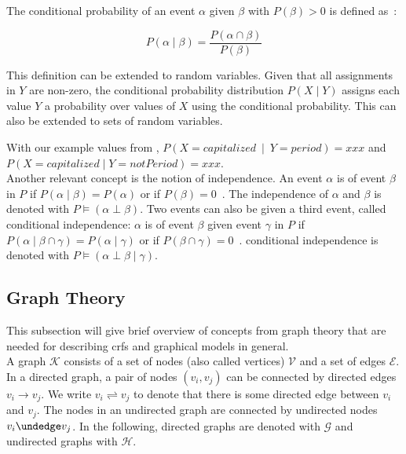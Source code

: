 The \gls{conditional probability} of an event $\alpha$ given $\beta$ with $P(\beta)>0$ is defined as~\cite{koller2009probabilistic}:

\begin{equation}
P(\alpha\mid\beta) = \frac{P(\alpha\cap\beta)}{P(\beta)}
\label{equ:conditional-probability}
\end{equation}

This definition can be extended to \glspl{random variable}.
Given that all assignments in $Y$ are non-zero, the \gls{conditional probability distribution} $P(X\mid Y)$ assigns each value $Y$ a probability over values of $X$ using the \gls{conditional probability}.
This can also be extended to sets of \glspl{random variable}.

With our example values from , $P(X=capitalized\ \mid\ Y=period)=xxx$ and $P(X=capitalized\mid Y=notPeriod)=xxx$.\\

Another relevant concept is the notion of \gls{independence}.
An \gls{event} $\alpha$ is  of \gls{event} $\beta$ in $P$ if $P(\alpha\mid\beta)=P(\alpha)$ or if $P(\beta)=0$~\cite{koller2009probabilistic}.
The \gls{independence} of $\alpha$ and $\beta$ is denoted with $P\models(\alpha\perp\beta)$.
Two \glspl{event} can also be  given a third \gls{event}, called \gls{conditional independence}:
$\alpha$ is  of \gls{event} $\beta$ given \gls{event} $\gamma$ in $P$ if $P(\alpha\mid\beta\cap\gamma)=P(\alpha\mid\gamma)$ or if $P(\beta\cap\gamma)=0$~\cite{koller2009probabilistic}.
\Gls{conditional independence} is denoted with $P\models(\alpha\perp\beta\mid\gamma)$.



\subsection{Graph Theory}\label{subsec:graph-theory}

This subsection will give brief overview of concepts from graph theory that are needed for describing \glspl{crf} and graphical models in general.\\

A \gls{graph} $\mathcal{K}$ consists of a set of \glspl{node} (also called vertices) $\mathcal{V}$ and a set of \glspl{edge} $\mathcal{E}$.
In a directed \gls{graph}, a pair of \glspl{node} $(v_i,v_j)$ can be connected by directed \glspl{edge} $v_i\to v_j$.
We write $v_i\rightleftharpoons v_j$ to denote that there is some directed edge between $v_i$ and $v_j$.
The \glspl{node} in an undirected graph are connected by undirected \glspl{node} $v_i\undedge v_j$.
In the following, directed \glspl{graph} are denoted with $\mathcal{G}$ and undirected \glspl{graph} with $\mathcal{H}$.

